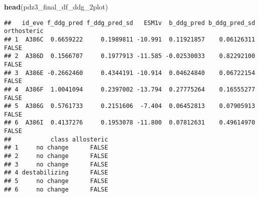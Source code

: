 \documentclass[
]{article}
\newenvironment{Shaded}{\begin{snugshade}}{\end{snugshade}}
\newcommand{\FunctionTok}[1]{\textcolor[rgb]{0.13,0.29,0.53}{\textbf{#1}}}
\newcommand{\NormalTok}[1]{#1}
\begin{document}
\begin{Shaded}
\begin{Highlighting}[]
\FunctionTok{head}\NormalTok{(pdz3\_final\_df\_ddg\_2plot)}
\end{Highlighting}
\end{Shaded}

\begin{verbatim}
##   id_eve f_ddg_pred f_ddg_pred_sd   ESM1v  b_ddg_pred b_ddg_pred_sd orthosteric
## 1  A386C  0.6659222     0.1989811 -10.991  0.11921857    0.06126311       FALSE
## 2  A386D  0.1566707     0.1977913 -11.585 -0.02530033    0.82292100       FALSE
## 3  A386E -0.2662460     0.4344191 -10.914  0.04624840    0.06722154       FALSE
## 4  A386F  1.0041094     0.2397002 -13.794  0.27775264    0.16555277       FALSE
## 5  A386G  0.5761733     0.2151606  -7.404  0.06452813    0.07905913       FALSE
## 6  A386I  0.4137276     0.1953078 -11.800  0.07812631    0.49614970       FALSE
##           class allosteric
## 1     no change      FALSE
## 2     no change      FALSE
## 3     no change      FALSE
## 4 destabilizing      FALSE
## 5     no change      FALSE
## 6     no change      FALSE
\end{verbatim}
\end{document}
